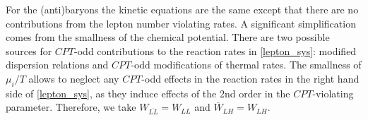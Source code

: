 \documentclass[12pt]{revtex4}
\newcommand{\ov}{\overline}
\begin{document}
	For the (anti)baryons the kinetic equations are the same except
	that there are no contributions from the lepton number violating
	rates. 
A significant simplification comes from the smallness of the chemical potential.
	There are two possible sources for $CPT$-odd contributions 
	to the reaction rates in \eqref{lepton_sys}: modified dispersion relations and 
	$CPT$-odd modifications of thermal rates.  The smallness of $\mu_i/T$ allows to neglect 
	any $CPT$-odd effects in the reaction rates in the right hand side of 
	\eqref{lepton_sys}, as
	they induce effects of the 2nd order in the $CPT$-violating parameter. Therefore, 
we take
	$ W_{\ov{LL}} = W_{LL} $ and
	$ \ov{W}_{L{H}} = W_{L{H}} $.
\end{document}
